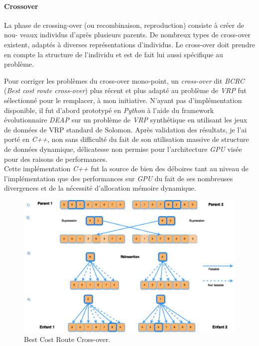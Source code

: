 \documentclass[12pt]{memoir}
\begin{document}
\paragraph{Crossover} %
\label{par:Crossover}
La phase de crossing-over (ou recombinaison, reproduction) consiste à créer de nou-
veaux individus d’après plusieurs parents. De nombreux types de cross-over existent,
adaptés à diverses représentations d’individus. Le cross-over doit prendre en compte la
structure de l’individu et est de fait lui aussi spécifique au problème.

Pour corriger les problèmes du cross-over mono-point, un
\emph{cross-over} dit \textit{BCRC\cite{ombuki2006multi}} (\emph{Best cost route cross-over}) plus
récent et plus adapté au problème de \textit{VRP} fut sélectionné pour le
remplacer, à mon initiative. N'ayant pas d'implémentation disponible, il
fut d'abord prototypé en \textit{Python} à l'aide du framework évolutionnaire
\emph{DEAP} sur un problème de \emph{VRP} synthétique en utilisant les
jeux de données de VRP standard de Solomon\cite{solomon1987algorithms}. Après validation des
résultats, je l'ai porté en \textit{C++}, non sans difficulté du fait de
son utilisation massive de structure de données dynamique, délicatesse
non permise pour l'architecture \textit{GPU} visée pour des raisons de
performances. \\
Cette implémentation \emph{C++} fut la source de bien des
déboires tant au niveau de l'implémentation que des performances sur
\textit{GPU} du fait de ses nombreuses divergences et de la nécessité
d'allocation mémoire dynamique.

\begin{figure}[htbp]
	\begin{center}
		\includegraphics[width=6in]{img/BCRC.png}
		\caption{Best Cost Route Cross-over.}
	\end{center}
\end{figure}
\end{document}
